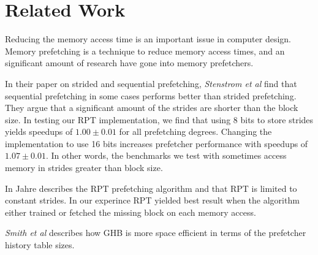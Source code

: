 \section{Related Work}
\label{sec:related-work}

Reducing the memory access time is an important issue in computer
design.  Memory prefetching is a technique to reduce memory access
times, and an significant amount of research have gone into memory
prefetchers.

In their paper on strided and sequential prefetching, \textit{Stenstrom
et al} \cite{bib:stride} find that sequential prefetching in some
cases performs better than strided prefetching. They argue that a
significant amount of the strides are shorter than the block size. In
testing our RPT implementation, we find that using 8 bits to store
strides yields speedups of $1.00\pm0.01$ for all prefetching
degrees. Changing the implementation to use 16 bits increases
prefetcher performance with speedups of $1.07\pm0.01$. In other words,
the benchmarks we test with sometimes access memory in strides greater
than block size.

In \cite{bib:jahre}
Jahre describes the RPT prefetching algorithm and that RPT is limited to constant strides.
In our experince RPT yielded best result when the algorithm either trained or fetched the missing block on each memory access.

\textit{Smith et al} \cite{bib:ghb}
describes how GHB is more space efficient in terms of the prefetcher history table sizes.




